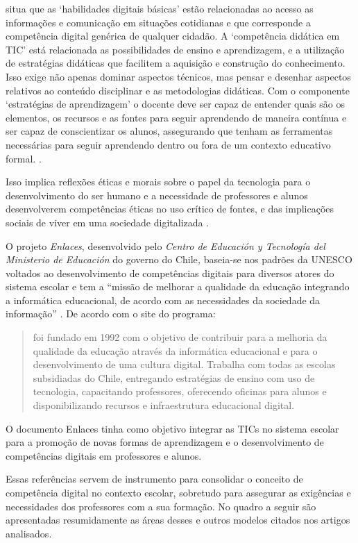 \documentclass[portuguese]{textolivre}
\begin{document}
\textcite{krumsvik2009} situa que as `habilidades digitais
básicas' estão relacionadas ao acesso as informações e
comunicação em situações cotidianas e que corresponde a competência
digital genérica de qualquer cidadão. A `competência
didática em TIC' está relacionada as possibilidades de
ensino e aprendizagem, e a utilização de estratégias didáticas que
facilitem a aquisição e construção do conhecimento. Isso exige não
apenas dominar aspectos técnicos, mas pensar e desenhar aspectos
relativos ao conteúdo disciplinar e as metodologias didáticas. Com o
componente `estratégias de
aprendizagem' o docente deve ser capaz de entender
quais são os elementos, os recursos e as fontes para seguir aprendendo
de maneira contínua e ser capaz de conscientizar os alunos, assegurando
que tenham as ferramentas necessárias para seguir aprendendo dentro ou
fora de um contexto educativo formal. \cite{krumsvik2009}.

Isso implica reflexões éticas e morais sobre o papel da tecnologia para
o desenvolvimento do ser humano e a necessidade de professores e alunos
desenvolverem competências éticas no uso crítico de fontes, e das
implicações sociais de viver em uma sociedade digitalizada
\cite{krumsvik2009}.

O projeto \emph{Enlaces}, desenvolvido pelo \emph{Centro de Educación y
Tecnología del Ministerio de Educación} do governo do Chile\emph{,
}baseia-se nos padrões da UNESCO voltados ao desenvolvimento de
competências digitais para diversos atores do sistema escolar e tem a
``missão de melhorar a qualidade da educação integrando a informática
educacional, de acordo com as necessidades da sociedade da informação''
\cite{mineduc2021}. De acordo com o site do programa:
\begin{quote}
foi fundado em 1992 com o objetivo de contribuir para a melhoria da
qualidade da educação através da informática educacional e para o
desenvolvimento de uma cultura digital. Trabalha com todas as escolas
subsidiadas do Chile, entregando estratégias de ensino com uso de
tecnologia, capacitando professores, oferecendo oficinas para alunos e
disponibilizando recursos e infraestrutura educacional digital.
\cite{mineduc2021}
\end{quote}

O documento Enlaces tinha como objetivo integrar as TICs no sistema
escolar para a promoção de novas formas de aprendizagem e o
desenvolvimento de competências digitais em professores e alunos.

Essas referências servem de instrumento para consolidar o conceito de
competência digital no contexto escolar, sobretudo para assegurar as
exigências e necessidades dos professores com a sua formação. No quadro
a seguir são apresentadas resumidamente as áreas desses e outros modelos
citados nos artigos analisados.
\end{document}
